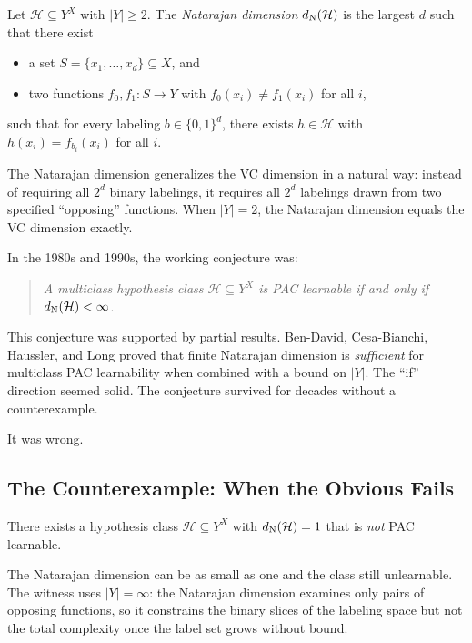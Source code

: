 \begin{defn}
\label{def:natarajan}
Let $\mathcal{H} \subseteq Y^X$ with $|Y| \geq 2$.  The \emph{Natarajan
dimension} $d_{\mathrm{N}}(\mathcal{H})$ is the largest $d$ such that there exist
\begin{itemize}[leftmargin=*,itemsep=1pt]
\item a set $S = \{x_1, \ldots, x_d\} \subseteq X$, and
\item two functions $f_0, f_1 \colon S \to Y$ with $f_0(x_i) \neq f_1(x_i)$
  for all $i$,
\end{itemize}
such that for every labeling $b \in \{0,1\}^d$, there exists $h \in
\mathcal{H}$ with $h(x_i) = f_{b_i}(x_i)$ for all $i$.
\end{defn}

The Natarajan dimension generalizes the VC dimension in a natural way: instead
of requiring all $2^d$ binary labelings, it requires all $2^d$ labelings
drawn from two specified ``opposing'' functions.  When $|Y| = 2$, the
Natarajan dimension equals the VC dimension exactly.

In the 1980s and 1990s, the working conjecture was:
\begin{quote}
\itshape A multiclass hypothesis class $\mathcal{H} \subseteq Y^X$ is PAC
learnable if and only if $d_{\mathrm{N}}(\mathcal{H}) < \infty$.
\end{quote}
This conjecture was supported by partial results.  Ben-David, Cesa-Bianchi,
Haussler, and Long proved that finite Natarajan dimension is
\emph{sufficient} for multiclass PAC learnability when combined with a bound
on $|Y|$.  The ``if'' direction seemed solid.  The conjecture survived for
decades without a counterexample.

It was wrong.


\subsection{The Counterexample: When the Obvious Fails}

\begin{thm}
\label{thm:natarajan-failure}
There exists a hypothesis class $\mathcal{H} \subseteq Y^X$ with
$d_{\mathrm{N}}(\mathcal{H}) = 1$ that is \emph{not} PAC learnable.
\end{thm}

The Natarajan dimension can be as small as one and the class still
unlearnable.  The witness uses $|Y| = \infty$: the Natarajan dimension
examines only pairs of opposing functions, so it constrains the binary slices
of the labeling space but not the total complexity once the label set grows
without bound.

